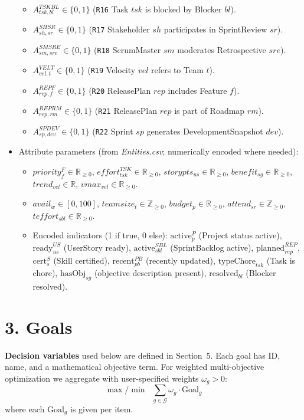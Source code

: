 \documentclass[11pt,a4paper]{article}
\begin{document}
\begin{itemize}[leftmargin=2.2em]
\begin{itemize}
    \item $A^{TSK BL}_{tsk,bl}\in\{0,1\}$ (\texttt{R16} Task $tsk$ is blocked by Blocker $bl$).
    \item $A^{SH SR}_{sh,sr}\in\{0,1\}$ (\texttt{R17} Stakeholder $sh$ participates in SprintReview $sr$).
    \item $A^{SM SRE}_{sm,sre}\in\{0,1\}$ (\texttt{R18} ScrumMaster $sm$ moderates Retrospective $sre$).
    \item $A^{VEL T}_{vel,t}\in\{0,1\}$ (\texttt{R19} Velocity $vel$ refers to Team $t$).
    \item $A^{REP F}_{rep,f}\in\{0,1\}$ (\texttt{R20} ReleasePlan $rep$ includes Feature $f$).
    \item $A^{REP RM}_{rep,rm}\in\{0,1\}$ (\texttt{R21} ReleasePlan $rep$ is part of Roadmap $rm$).
    \item $A^{SP DEV}_{sp,dev}\in\{0,1\}$ (\texttt{R22} Sprint $sp$ generates DevelopmentSnapshot $dev$).
  \end{itemize}
  \item Attribute parameters (from \emph{Entities.csv}; numerically encoded where needed):
  \begin{itemize}
    \item $priority^F_f\in\mathbb{R}_{\ge0}$, $effort^{TSK}_{tsk}\in\mathbb{R}_{\ge0}$, $storypts_{us}\in\mathbb{R}_{\ge0}$, $benefit_{sg}\in\mathbb{R}_{\ge0}$, $trend_{vel}\in\mathbb{R}$, $vmax_{vel}\in\mathbb{R}_{\ge0}$.
    \item $avail_w\in[0,100]$, $teamsize_t\in\mathbb{Z}_{\ge0}$, $budget_p\in\mathbb{R}_{\ge0}$, $attend_{sr}\in\mathbb{Z}_{\ge0}$, $teffort_{sbl}\in\mathbb{R}_{\ge0}$.
    \item Encoded indicators (1 if true, 0 else): $\text{active}^P_p$ (Project status active), $\text{ready}^{US}_{us}$ (UserStory ready), $\text{active}^{SBL}_{sbl}$ (SprintBacklog active), $\text{planned}^{REP}_{rep}$, $\text{cert}^{S}_s$ (Skill certified), $\text{recent}^{PB}_{pb}$ (recently updated), $\text{typeChore}_{tsk}$ (Task is chore), $\text{hasObj}_{sg}$ (objective description present), $\text{resolved}_{bl}$ (Blocker resolved).
  \end{itemize}
\end{itemize}

\section{3. Goals}
\textbf{Decision variables} used below are defined in Section~5. Each goal has ID, name, and a mathematical objective term. For weighted multi-objective optimization we aggregate with user-specified weights $\omega_g>0$:
\[
\max/\min \;\; \sum_{g\in\mathcal{G}} \omega_g \cdot \text{Goal}_g
\]
where each $\text{Goal}_g$ is given per item.
\end{document}
